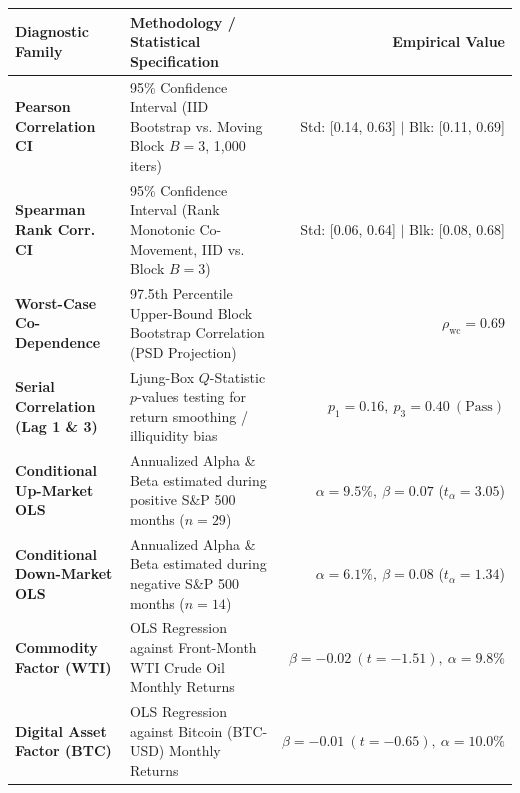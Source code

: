 \documentclass[10pt,a4paper]{article}
\begin{document}
\vspace{0.45em}

\begin{tcolorbox}[colback=white, colframe=primary, title=\textbf{\small\strut Appendix A: Extended Statistical, Bootstrap \& Factor Diagnostics}, fonttitle=\sffamily\bfseries\small, arc=5pt, boxrule=0.8pt, toptitle=4pt, bottomtitle=4pt, left=6pt, right=6pt, top=3.5pt, bottom=3.5pt, colbacktitle=primary]
\renewcommand{\arraystretch}{1.22}
\scriptsize
\begin{tabularx}{\textwidth}{l X r}
\toprule
\textbf{\textcolor{primary}{Diagnostic Family}} & \textbf{\textcolor{primary}{Methodology / Statistical Specification}} & \textbf{\textcolor{primary}{Empirical Value}} \\
\midrule
\textbf{Pearson Correlation CI} & 95\% Confidence Interval (IID Bootstrap vs. Moving Block $B=3$, 1,000 iters) & Std: [0.14, 0.63] $\vert$ Blk: [0.11, 0.69] \\
\rowcolor{cardbg} \textbf{Spearman Rank Corr. CI} & 95\% Confidence Interval (Rank Monotonic Co-Movement, IID vs. Block $B=3$) & Std: [0.06, 0.64] $\vert$ Blk: [0.08, 0.68] \\
\textbf{Worst-Case Co-Dependence} & 97.5th Percentile Upper-Bound Block Bootstrap Correlation (PSD Projection) & $\rho_{\text{wc}} = 0.69$ \\
\rowcolor{cardbg} \textbf{Serial Correlation (Lag 1 \& 3)} & Ljung-Box $Q$-Statistic $p$-values testing for return smoothing / illiquidity bias & $p_1=0.16,\ p_3=0.40\ (\text{Pass})$ \\
\textbf{Conditional Up-Market OLS} & Annualized Alpha \& Beta estimated during positive S\&P 500 months ($n=29$) & $\alpha=9.5\%,\ \beta=0.07$ ($t_\alpha=3.05$) \\
\rowcolor{cardbg} \textbf{Conditional Down-Market OLS} & Annualized Alpha \& Beta estimated during negative S\&P 500 months ($n=14$) & $\alpha=6.1\%,\ \beta=0.08$ ($t_\alpha=1.34$) \\
\textbf{Commodity Factor (WTI)} & OLS Regression against Front-Month WTI Crude Oil Monthly Returns & $\beta=-0.02\ (t=-1.51),\ \alpha=9.8\%$ \\
\rowcolor{cardbg} \textbf{Digital Asset Factor (BTC)} & OLS Regression against Bitcoin (BTC-USD) Monthly Returns & $\beta=-0.01\ (t=-0.65),\ \alpha=10.0\%$ \\
\bottomrule
\end{tabularx}
\end{tcolorbox}
\end{document}
